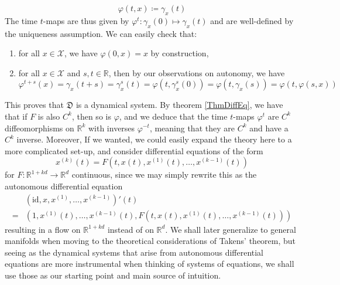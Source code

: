 \documentclass[11pt, a4paper]{memoir}
\theoremstyle{break}
\theoremstyle{break}
\theoremstyle{nonumberplain}
\newcommand{\mR}{\mathbb{R}}
\begin{document}
$$\varphi(t,x)\coloneqq \gamma_x(t)$$
The time $t$-maps are thus given by $\varphi^t:\gamma_x(0)\mapsto \gamma_x(t)$ and are well-defined by the uniqueness assumption. We can easily check that:
\begin{enumerate}[label=(\roman*)]
	\item for all $x\in \mathcal{X}$, we have $\varphi(0,x)=x$ by construction,
	\item for all $x\in \mathcal{X}$ and $s,t\in \mR$, then by our observations on autonomy, we have
	$$\varphi^{t+s}(x)=\gamma_x(t+s)=\gamma_x^s(t)=\varphi(t,\gamma_x^s(0))=\varphi(t,\gamma_x(s))=\varphi(t,\varphi(s,x))$$
\end{enumerate}
This proves that $\mathfrak{D}$ is a dynamical system. By theorem \ref{ThmDiffEq}, we have that if $F$ is also $C^k$, then so is $\varphi$, and we deduce that the time $t$-maps $\varphi^t$ are $C^k$ diffeomorphisms on $\mR^k$ with inverses $\varphi^{-t}$, meaning that they are $C^k$ and have a $C^k$ inverse. Moreover, If we wanted, we could easily expand the theory here to a more complicated set-up, and consider differential equations of the form
$$x^{(k)}(t)=F\left(t,x(t),x^{(1)}(t),\ldots, x^{(k-1)}(t)\right)$$
for $F:\mR^{1+kd}\to\mR^d$ continuous, since we may simply rewrite this as the autonomous differential equation
\begin{align*}
&\left(\text{id},x,x^{(1)},\ldots,x^{(k-1)}\right)'(t)\\
=&\left(1,x^{(1)}(t),\ldots,x^{(k-1)}(t),F\left(t,x(t),x^{(1)}(t),\ldots, x^{(k-1)}(t)\right)\right)
\end{align*}
resulting in a flow on $\mR^{1+kd}$ instead of on $\mR^d$. We shall later generalize to general manifolds when moving to the theoretical considerations of Takens' theorem, but seeing as the dynamical systems that arise from autonomous differential equations are more instrumental when thinking of systems of equations, we shall use those as our starting point and main source of intuition.
\end{document}
